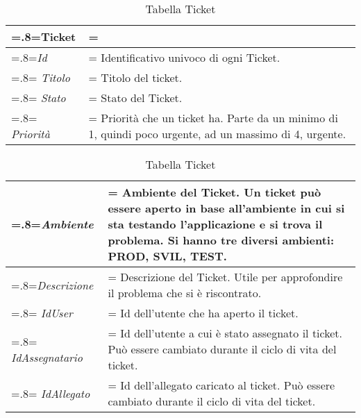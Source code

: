 \begin{table}[H]
                \centering
                \renewcommand{\arraystretch}{1.8}
                \renewcommand\tabularxcolumn[1]{m{#1}}
                \begin{tabularx}{0.9\textwidth} {
                    >{\hsize=.8\hsize\linewidth=\hsize}X
                    >{\hsize=1.2\hsize\linewidth=\hsize}X}
                    \textbf{Ticket}\\
                    \hline
                    \textit{Id} & Identificativo univoco di ogni Ticket. \\
                    \hline
                    \textit{Titolo} & Titolo del ticket.  \\
                    \hline
                    \textit{Stato} & Stato del Ticket. \\
                    \hline
                    \textit{Priorità} & Priorità che un ticket ha. Parte da un minimo di 1, quindi poco urgente, ad un massimo di 4, urgente. \\
                    \hline            
            
                 \end{tabularx}
                \smallskip
                \caption{Tabella Ticket}
            \end{table}  
            
 \begin{table}[H]
                \centering
                \renewcommand{\arraystretch}{1.8}
                \renewcommand\tabularxcolumn[1]{m{#1}}
                \begin{tabularx}{0.9\textwidth} {
                    >{\hsize=.8\hsize\linewidth=\hsize}X
                    >{\hsize=1.2\hsize\linewidth=\hsize}X}
                    \hline
                    \textit{Ambiente} & Ambiente del Ticket. Un ticket può essere aperto in base all'ambiente in cui si sta testando l'applicazione e si trova il problema. Si hanno tre diversi ambienti: PROD, SVIL, TEST.\\
                    \hline
                    \textit{Descrizione} & Descrizione del Ticket. Utile per approfondire il problema che si è riscontrato.\\
                    \hline
                    \textit{IdUser} & Id dell'utente che ha aperto il ticket. \\
                    \hline
                    \textit{IdAssegnatario} &  Id dell'utente a cui è stato assegnato il ticket. Può essere cambiato durante il ciclo di vita del ticket. \\
                
                    \hline
                   \textit{IdAllegato} &  Id dell'allegato caricato al ticket. Può essere cambiato durante il ciclo di vita del ticket. \\
                
                    \hline
                \end{tabularx}
                \smallskip
                \caption{Tabella Ticket}
            \end{table}   
                 
